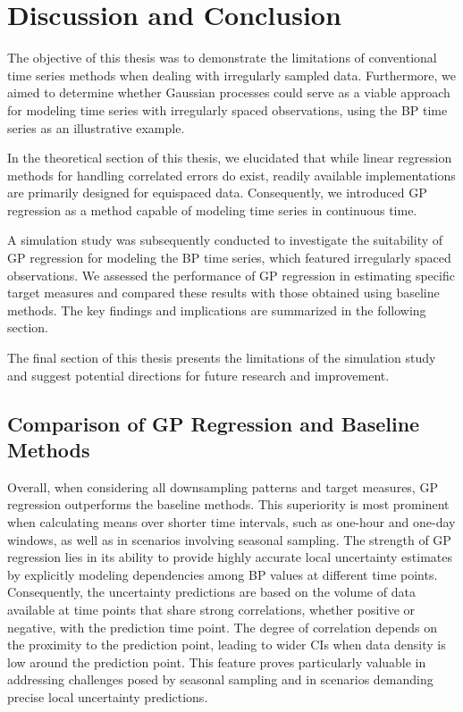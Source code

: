 \chapter{Discussion and Conclusion}\label{ch:discussion-and-conclusion}

The objective of this thesis was to demonstrate the limitations of conventional
time series methods when dealing with irregularly sampled data.
Furthermore, we aimed to determine whether Gaussian processes could serve as a
viable approach for modeling time series with irregularly spaced observations,
using the BP time series as an illustrative example.

In the theoretical section of this thesis, we elucidated that while linear
regression methods for handling correlated errors do exist, readily available
implementations are primarily designed for equispaced data.
Consequently, we introduced GP regression as a method capable of modeling
time series in continuous time.

A simulation study was subsequently conducted to investigate
the suitability of GP regression for modeling the BP time series,
which featured irregularly spaced observations. We assessed the performance of
GP regression in estimating specific target measures and compared these
results with those obtained using baseline methods.
The key findings and implications are summarized in the following section.

The final section of this thesis presents the limitations of the
simulation study and suggest potential directions
for future research and improvement.


\section{Comparison of GP Regression and Baseline Methods}

Overall, when considering all downsampling patterns and target measures,
GP regression outperforms the baseline methods.
This superiority is most prominent when calculating means over shorter time intervals,
such as one-hour and one-day windows, as well as in scenarios involving seasonal sampling.
The strength of GP regression lies in its ability to provide highly
accurate local uncertainty estimates by explicitly modeling dependencies
among BP values at different time points.
Consequently, the uncertainty predictions are based on the volume of data available at time points that share
strong correlations, whether positive or negative, with the prediction time point.
The degree of correlation depends on the proximity to the prediction point,
leading to wider CIs when data density is low around the prediction point.
This feature proves particularly valuable in addressing challenges posed by seasonal
sampling and in scenarios demanding precise local uncertainty predictions.

